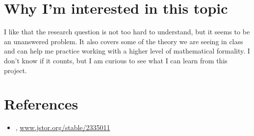 \documentclass[]{STAT_547C}
\begin{document}
\section{Why I'm interested in this topic}

I like that the research question is not too hard to understand, but it seems to be an unanswered problem. It also covers some of the theory we are seeing in class and can help me practice working with a higher level of mathematical formality. I don't know if it counts, but I am curious to see what I can learn from this project.


\printbibliography
\section{References}
\begin{itemize}
\item \citet{Peskun, P. H. ``Optimum Monte-Carlo Sampling Using Markov Chains.'' Biometrika, vol. 60, no. 3, 1973, pp. 607-612. JSTOR}, \href{www.jstor.org/stable/2335011}{www.jstor.org/stable/2335011}
\end{itemize}
\end{document}
